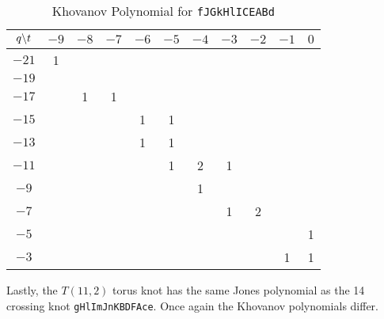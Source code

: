 \documentclass{article}
\theoremstyle{plain}
\begin{document}
        \begin{table}[H]
            \centering
            \begin{tabular}{| c | c | c | c | c | c | c | c | c | c | c |}
                \hline
                $q\symbol{92}t$&$-9$&$-8$&$-7$&$-6$&$-5$&$-4$&$-3$&$-2$&$-1$&$0$\\
                \hline
                $-21$&1&&&&&&&&&\\
                \hline
                $-19$&&&&&&&&&&\\
                \hline
                $-17$&&1&1&&&&&&&\\
                \hline
                $-15$&&&&1&1&&&&&\\
                \hline
                $-13$&&&&1&1&&&&&\\
                \hline
                $-11$&&&&&1&2&1&&&\\
                \hline
                $-9$&&&&&&1&&&&\\
                \hline
                $-7$&&&&&&&1&2&&\\
                \hline
                $-5$&&&&&&&&&&1\\
                \hline
                $-3$&&&&&&&&&1&1\\
                \hline
            \end{tabular}
            \caption{Khovanov Polynomial for \texttt{fJGkHlICEABd}}
            \label{table:fJGkHlICEABd_kho}
        \end{table}
        Lastly, the $T(11,2)$ torus knot has the same Jones polynomial as the
        14 crossing knot \texttt{gHlImJnKBDFAce}. Once again the Khovanov
        polynomials differ.
\end{document}

